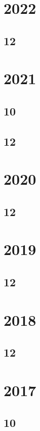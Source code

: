 \documentclass[11pt]{book}
\begin{document}
\section{2022}
\subsection{12}

\section{2021}
\subsection{10}

\subsection{12}

\section{2020} 
\subsection{12} 

\section{2019} 
\subsection{12}





\section{2018} 
\subsection{12}



\section{2017}
\subsection{10}
\end{document}
